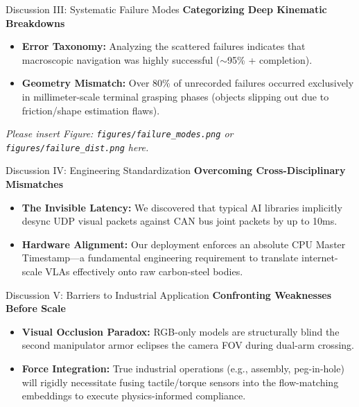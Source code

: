 \documentclass[aspectratio=169, t]{beamer}
\begin{document}
\begin{frame}{Discussion III: Systematic Failure Modes}
    {\Large \textbf{Categorizing Deep Kinematic Breakdowns}}
    \vspace{0.5cm}
    \begin{itemize}
        \item \textbf{Error Taxonomy:} Analyzing the scattered failures indicates that macroscopic navigation was highly successful ($\sim$95\% + completion).
        \item \textbf{Geometry Mismatch:} Over 80\% of unrecorded failures occurred exclusively in millimeter-scale terminal grasping phases (objects slipping out due to friction/shape estimation flaws).
    \end{itemize}
    \vfill
    \textit{Please insert Figure: \texttt{figures/failure_modes.png} or \texttt{figures/failure_dist.png} here.}
\end{frame}

\begin{frame}{Discussion IV: Engineering Standardization}
    {\Large \textbf{Overcoming Cross-Disciplinary Mismatches}}
    \vspace{0.5cm}
    \begin{itemize}
        \item \textbf{The Invisible Latency:} We discovered that typical AI libraries implicitly desync UDP visual packets against CAN bus joint packets by up to 10ms.
        \item \textbf{Hardware Alignment:} Our deployment enforces an absolute CPU Master Timestamp—a fundamental engineering requirement to translate internet-scale VLAs effectively onto raw carbon-steel bodies.
    \end{itemize}
\end{frame}

\begin{frame}{Discussion V: Barriers to Industrial Application}
    {\Large \textbf{Confronting Weaknesses Before Scale}}
    \vspace{0.5cm}
    \begin{itemize}
        \item \textbf{Visual Occlusion Paradox:} RGB-only models are structurally blind the second manipulator armor eclipses the camera FOV during dual-arm crossing.
        \item \textbf{Force Integration:} True industrial operations (e.g., assembly, peg-in-hole) will rigidly necessitate fusing tactile/torque sensors into the flow-matching embeddings to execute physics-informed compliance.
    \end{itemize}
\end{frame}
\end{document}
